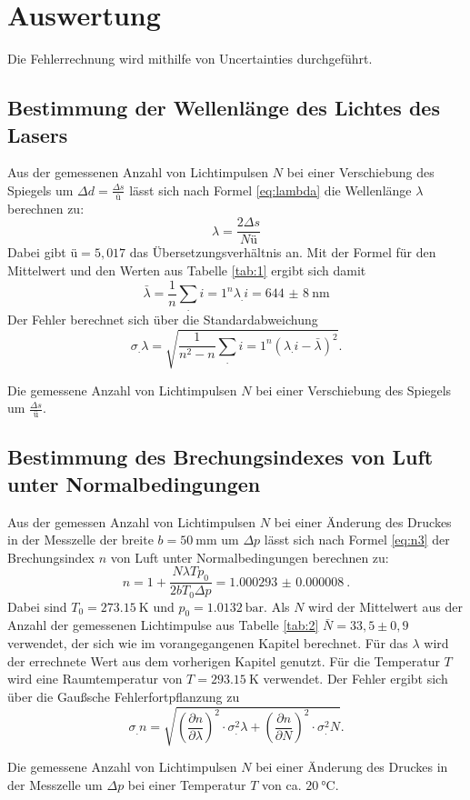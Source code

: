 \section{Auswertung}
\label{sec:Auswertung}

Die Fehlerrechnung wird mithilfe von Uncertainties \cite{uncertainties} durchgeführt.

\subsection{Bestimmung der Wellenlänge des Lichtes des Lasers}

Aus der gemessenen Anzahl von Lichtimpulsen $N$ bei einer Verschiebung des Spiegels um $\Delta d=\frac{\Delta s}{ü}$ lässt sich nach Formel \eqref{eq:lambda} die Wellenlänge $\lambda$ berechnen zu:
\[
	\lambda = \frac{2\Delta s}{N ü}
\]
Dabei gibt $ü=5,017$ das Übersetzungsverhältnis an.
Mit der Formel für den Mittelwert und den Werten aus Tabelle \ref{tab:1} ergibt sich damit
\[
\bar{\lambda}= \frac{1}{n}\sum_.{i=1}^n \lambda_.i = \SI{644(8)}{\nano\meter}
\]
Der Fehler berechnet sich über die Standardabweichung
\[
\sigma_.{\lambda}=\sqrt{\frac{1}{n^2-n}\sum_.{i=1}^n \left(\lambda_.i-\bar{\lambda}\right)^2}\text{.}
\]

\begin{table}
	\centering
	\caption{Die gemessene Anzahl von Lichtimpulsen $N$ bei einer Verschiebung des Spiegels um $\frac{\Delta s}{ü}$.}
	
	\label{tab:1}
\end{table}

\subsection{Bestimmung des Brechungsindexes von Luft unter Normalbedingungen}

Aus der gemessen Anzahl von Lichtimpulsen $N$ bei einer Änderung des Druckes in der Messzelle der breite $b=\SI{50}{\milli\meter}$ um $\Delta p$ lässt sich nach Formel \eqref{eq:n3} der Brechungsindex $n$ von Luft unter Normalbedingungen berechnen zu:
\[
	n = 1+ \frac{N \lambda T p_0}{2 b T_0 \Delta p} = \SI{1.000293(8)}{}\text{.}
\]
Dabei sind $T_0=\SI{273,15}{\kelvin}$ und $p_0=\SI{1,0132}{\bar}$. Als $N$ wird der Mittelwert aus der Anzahl der gemessenen Lichtimpulse aus Tabelle \ref{tab:2}
$\bar{N}=33,5 \pm 0,9$ verwendet, der sich wie im vorangegangenen Kapitel berechnet. Für das $\lambda$ wird der errechnete Wert aus dem vorherigen Kapitel genutzt. Für die Temperatur $T$ wird eine Raumtemperatur von $T=\SI{293,15}{\kelvin}$ verwendet.
Der Fehler ergibt sich über die Gaußsche Fehlerfortpflanzung zu
\[
\sigma_.n=\sqrt{\left(\frac{\partial n}{\partial \lambda}\right)^2\cdot\sigma^2_.{\lambda}+\left(\frac{\partial n}{\partial N}\right)^2\cdot\sigma^2_.N}\text{.}
\]
\begin{table}
	\centering
	\caption{Die gemessene Anzahl von Lichtimpulsen $N$ bei einer Änderung des Druckes in der Messzelle um $\Delta p$ bei einer Temperatur $T$ von ca. $\SI{20}{\degreeCelsius}$.}
	
	\label{tab:2}
\end{table}